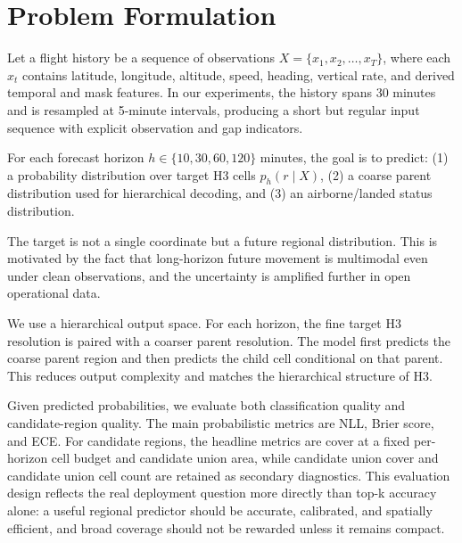 \section{Problem Formulation}

Let a flight history be a sequence of observations $X = \{x_1, x_2, \dots, x_T\}$, where each $x_t$ contains latitude, longitude, altitude, speed, heading, vertical rate, and derived temporal and mask features. In our experiments, the history spans 30 minutes and is resampled at 5-minute intervals, producing a short but regular input sequence with explicit observation and gap indicators.

For each forecast horizon $h \in \{10, 30, 60, 120\}$ minutes, the goal is to predict: (1) a probability distribution over target H3 cells $p_h(r \mid X)$, (2) a coarse parent distribution used for hierarchical decoding, and (3) an airborne/landed status distribution.

The target is not a single coordinate but a future regional distribution. This is motivated by the fact that long-horizon future movement is multimodal even under clean observations, and the uncertainty is amplified further in open operational data.

We use a hierarchical output space. For each horizon, the fine target H3 resolution is paired with a coarser parent resolution. The model first predicts the coarse parent region and then predicts the child cell conditional on that parent. This reduces output complexity and matches the hierarchical structure of H3.

Given predicted probabilities, we evaluate both classification quality and candidate-region quality. The main probabilistic metrics are NLL, Brier score, and ECE. For candidate regions, the headline metrics are cover at a fixed per-horizon cell budget and candidate union area, while candidate union cover and candidate union cell count are retained as secondary diagnostics. This evaluation design reflects the real deployment question more directly than top-k accuracy alone: a useful regional predictor should be accurate, calibrated, and spatially efficient, and broad coverage should not be rewarded unless it remains compact.
